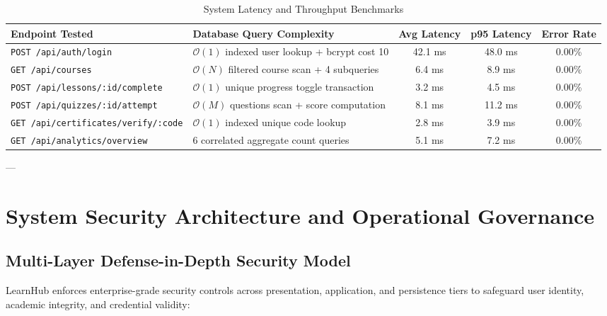 \documentclass[12pt,a4paper]{report}
\begin{document}
\begin{table}[H]
\centering
\caption{System Latency and Throughput Benchmarks}
\label{tab:benchmarks}
\begin{tabularx}{\textwidth}{@{}lXccc@{}}
\toprule
\textbf{Endpoint Tested} & \textbf{Database Query Complexity} & \textbf{Avg Latency} & \textbf{p95 Latency} & \textbf{Error Rate} \\ \midrule
\texttt{POST /api/auth/login} & $\mathcal{O}(1)$ indexed user lookup + bcrypt cost 10 & 42.1 ms & 48.0 ms & 0.00\% \\
\texttt{GET /api/courses} & $\mathcal{O}(N)$ filtered course scan + 4 subqueries & 6.4 ms & 8.9 ms & 0.00\% \\
\texttt{POST /api/lessons/:id/complete} & $\mathcal{O}(1)$ unique progress toggle transaction & 3.2 ms & 4.5 ms & 0.00\% \\
\texttt{POST /api/quizzes/:id/attempt} & $\mathcal{O}(M)$ questions scan + score computation & 8.1 ms & 11.2 ms & 0.00\% \\
\texttt{GET /api/certificates/verify/:code} & $\mathcal{O}(1)$ indexed unique code lookup & 2.8 ms & 3.9 ms & 0.00\% \\
\texttt{GET /api/analytics/overview} & 6 correlated aggregate count queries & 5.1 ms & 7.2 ms & 0.00\% \\ \bottomrule
\end{tabularx}
\end{table}

---

\chapter{System Security Architecture and Operational Governance}

\section{Multi-Layer Defense-in-Depth Security Model}
LearnHub enforces enterprise-grade security controls across presentation, application, and persistence tiers to safeguard user identity, academic integrity, and credential validity:
\end{document}
